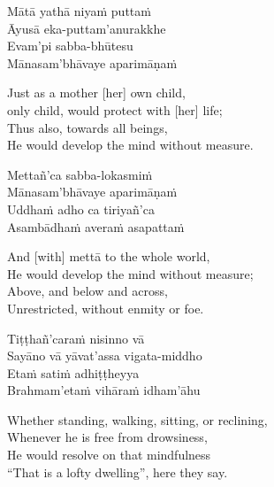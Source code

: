 \begin{pali-hang-continued}
  Mātā yathā niyaṁ puttaṁ\\
  Āyusā eka-puttam'anurakkhe\\
  Evam'pi sabba-bhūtesu\\
  Mānasam'bhāvaye aparimāṇaṁ
\end{pali-hang-continued}

\begin{english-verses}
  Just as a mother [her] own child,\\\relax
  [Her] only child, would protect with [her] life; \\
  Thus also, towards all beings,\\
  He would develop the mind without measure.
\end{english-verses}

\begin{pali-hang-continued}
  Mettañ'ca sabba-lokasmiṁ\\
  Mānasam'bhāvaye aparimāṇaṁ\\
  Uddhaṁ adho ca tiriyañ'ca\\
  Asambādhaṁ averaṁ asapattaṁ
\end{pali-hang-continued}

\begin{english-verses}
  And [with] mettā to the whole world,\\
  He would develop the mind without measure;\\
  Above, and below and across,\\
  Unrestricted, without enmity or foe.
\end{english-verses}

\begin{pali-hang-continued}
  Tiṭṭhañ'caraṁ nisinno vā\\
  Sayāno vā yāvat'assa vigata-middho\\
  Etaṁ satiṁ adhiṭṭheyya\\
  Brahmam'etaṁ vihāraṁ idham'āhu
\end{pali-hang-continued}

\begin{english-verses}
  Whether standing, walking, sitting, or reclining,\\
  Whenever he is free from drowsiness,\\
  He would resolve on that mindfulness\\
  ``That is a lofty dwelling'', here they say.
\end{english-verses}

